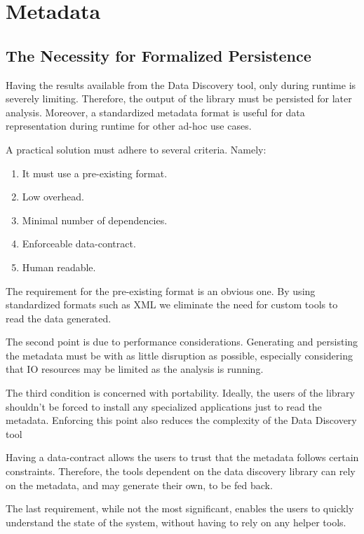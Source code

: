 \section{Metadata}
\subsection{The Necessity for Formalized Persistence}

Having the results available from the Data Discovery tool, only during runtime is severely limiting.
Therefore, the output of the library must be persisted for later analysis.
Moreover, a standardized
metadata format is useful for data representation during runtime for other ad-hoc use cases.
\newline

A practical solution must adhere to several criteria.
Namely:
\begin{enumerate}
    \item It must use a pre-existing format.
    \item Low overhead.
    \item Minimal number of dependencies.
    \item Enforceable data-contract.
    \item Human readable.
\end{enumerate}

The requirement for the pre-existing format is an obvious one.
By using standardized formats such as XML we eliminate the need for custom tools to read the
data generated.

The second point is due to performance considerations. Generating and persisting the metadata must be
with as little disruption as possible, especially considering that IO resources may be limited as the
analysis is running.

The third condition is concerned with portability.
Ideally, the users of the library shouldn't be
forced to install any specialized applications just to read the metadata.
Enforcing this point also reduces the complexity of the Data Discovery tool

Having a data-contract allows the users to trust that the metadata follows certain constraints.
Therefore, the tools dependent on the data discovery library can rely on the metadata, and may generate their own,
to be fed back.

The last requirement, while not the most significant, enables the users to quickly understand the
state of the system, without having to rely on any helper tools.

